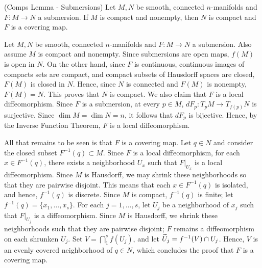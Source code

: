 \documentclass{article}
\begin{document}
\begin{prb}{(Comps Lemma - Submersions)}
	Let $M, N$ be smooth, connected $n$-manifolds and $F: M \to N$ a submersion. If $M$ is compact and nonempty, then $N$ is compact and $F$ is a covering map. 
\end{prb}
\begin{solutions}
	Let $M, N$ be smooth, connected $n$-manifolds and $F:M \to N$ a submersion. Also assume $M$ is compact and nonempty. Since submersions are open maps, $f(M)$ is open in $N$. On the other hand, since $F$ is continuous, continuous images of compacts sets are compact, and compact subsets of Hausdorff spaces are closed, $F(M)$ is closed in $N$. Hence, since $N$ is connected and $F(M)$ is nonempty, $F(M) = N$. This proves that $N$ is compact. We also claim that $F$ is a local diffeomorphism. Since $F$ is a submersion, at every $p \in M$, $dF_{p}: T_{p}M \to T_{f(p)}N$ is surjective. Since $\dim{M}= \dim{N} = n$, it follows that $dF_{p}$ is bijective. Hence, by the Inverse Function Theorem, $F$ is a local diffeomorphism. 
	
	All that remains to be seen is that $F$ is a covering map. Let $q \in N$ and consider the closed subset $F^{-1}(q) \subset M$. Since $F$ is a local diffeomorphism, for each $x \in F^{-1}(q)$, there exists a neighborhood $U_{x}$ such that $F|_{U_{x}}$ is a local diffeomorphism. Since $M$ is Hausdorff, we may shrink these neighborhoods so that they are pairwise disjoint. This means that each $x \in F^{-1}(q)$ is isolated, and hence, $f^{-1}(q)$ is discrete. Since $M$ is compact, $f^{-1}(q)$ is finite; let $f^{-1}(q) = \{x_{1},\ldots, x_{s}\}$. For each $j = 1, \ldots, s$, let $U_{j}$ be a neighborhood of $x_{j}$ such that $F|_{U_{j}}$ is a diffeomorphism. Since $M$ is Hausdorff, we shrink these neighborhoods such that they are pairwise disjoint; $F$ remains a diffeomorphism on each shrunken $U_{j}$. Set $V = \bigcap_{1}^{s}f(U_{j})$, and let $\widetilde{U}_{j} = f^{-1}(V) \cap U_{j}$. Hence, $V$ is an evenly covered neighborhood of $q \in N$, which concludes the proof that $F$ is a covering map. 
\end{solutions}
\end{document}
